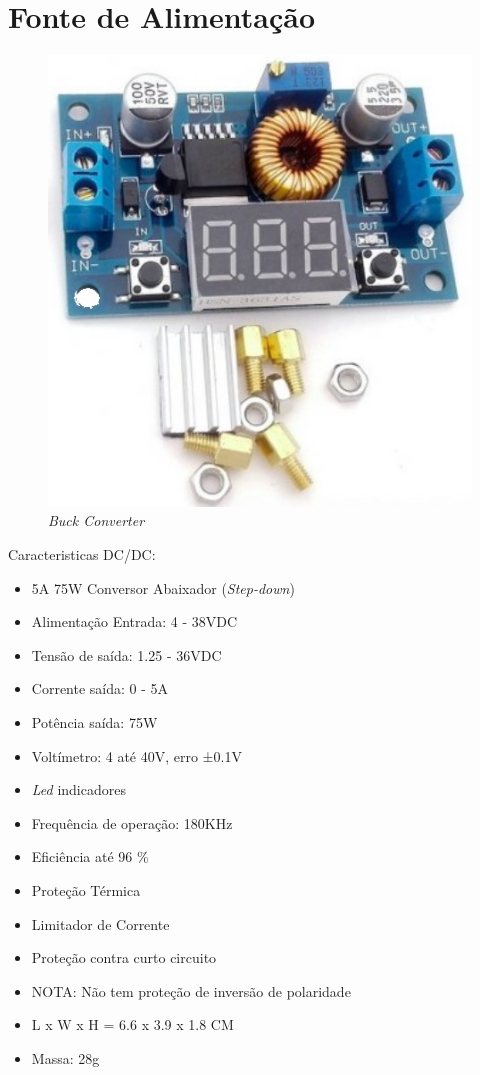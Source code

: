 \section{Fonte de Alimentação}
\begin{minipage}[!b]{.5\linewidth}
	\begin{figure}[H]
		\captionsetup{justification=raggedright,singlelinecheck=false}
		\flushleft
		\includegraphics[scale=0.5]{./image/PESTA/material/DCDC_converter.jpg}
		\caption{\textit{Buck Converter}}
		\label{buck-converter}
	\end{figure}
\end{minipage}
\begin{minipage}[!b]{.5\linewidth}
\small
Caracteristicas DC/DC:
	\begin{itemize}
		\setlength\itemsep{-0.5em}
		\footnotesize
		\item 5A 75W Conversor Abaixador (\textit{Step-down})
		\item Alimentação Entrada: 4 - 38VDC
		\item Tensão de saída: 1.25 - 36VDC
		\item Corrente saída: 0 - 5A
		\item Potência saída: 75W
		\item Voltímetro: 4 até 40V, erro ±0.1V
		\item \textit{Led} indicadores
		\item Frequência de operação: 180KHz
		\item Eficiência até 96 \%
		\item Proteção Térmica
		\item Limitador de Corrente
		\item Proteção contra curto circuito
		\item NOTA: Não tem proteção de inversão de polaridade
		\item L x W x H = 6.6 x 3.9 x 1.8 CM
		\item Massa: 28g
	\end{itemize}
\end{minipage}
